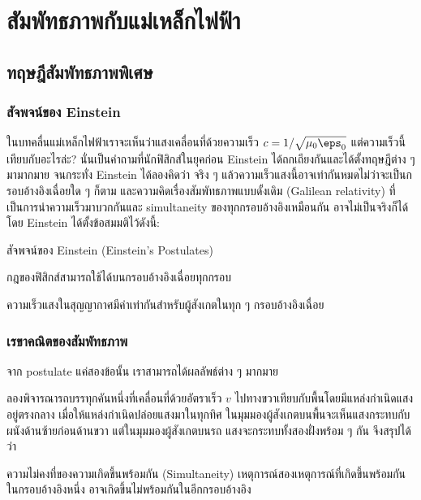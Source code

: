 \chapter{สัมพัทธภาพกับแม่เหล็กไฟฟ้า}

\section{ทฤษฎีสัมพัทธภาพพิเศษ}

\subsection{สัจพจน์ของ Einstein}

ในบทคลื่นแม่เหล็กไฟฟ้าเราจะเห็นว่าแสงเคลื่อนที่ด้วยความเร็ว $c = 1/\sqrt{\mu_0\eps_0}$ แต่ความเร็วนี้เทียบกับอะไรล่ะ? นั่นเป็นคำถามที่นักฟิสิกส์ในยุคก่อน Einstein ได้ถกเถียงกันและได้ตั้งทฤษฎีต่าง ๆ มามากมาย จนกระทั่ง Einstein ได้ลองคิดว่า จริง ๆ แล้วความเร็วแสงนี้อาจเท่ากันหมดไม่ว่าจะเป็นกรอบอ้างอิงเฉื่อยใด ๆ ก็ตาม และความคิดเรื่องสัมพัทธภาพแบบดั้งเดิม (Galilean relativity) ที่เป็นการนำความเร็วมาบวกกันและ simultaneity ของทุกกรอบอ้างอิงเหมือนกัน อาจไม่เป็นจริงก็ได้ โดย Einstein ได้ตั้งข้อสมมติไว้ดังนี้:
\begin{lawbox}{สัจพจน์ของ Einstein (Einstein's Postulates)}
    \begin{compactenum}
        \item กฎของฟิสิกส์สามารถใช้ได้บนกรอบอ้างอิงเฉื่อยทุกกรอบ
        \item ความเร็วแสงในสุญญากาศมีค่าเท่ากันสำหรับผู้สังเกตในทุก ๆ กรอบอ้างอิงเฉื่อย
    \end{compactenum}
\end{lawbox}

\subsection{เรขาคณิตของสัมพัทธภาพ}

จาก postulate แค่สองข้อนั้น เราสามารถได้ผลลัพธ์ต่าง ๆ มากมาย

ลองพิจารณารถบรรทุกคันหนึ่งที่เคลื่อนที่ด้วยอัตราเร็ว $v$ ไปทางขวาเทียบกับพื้นโดยมีแหล่งกำเนิดแสงอยู่ตรงกลาง เมื่อให้แหล่งกำเนิดปล่อยแสงมาในทุกทิศ ในมุมมองผู้สังเกตบนพื้นจะเห็นแสงกระทบกับผนังด้านซ้ายก่อนด้านขวา แต่ในมุมมองผู้สังเกตบนรถ แสงจะกระทบทั้งสองฝั่งพร้อม ๆ กัน จึงสรุปได้ว่า
\begin{lawbox}{ความไม่คงที่ของความเกิดขึ้นพร้อมกัน (Simultaneity)}
    เหตุการณ์สองเหตุการณ์ที่เกิดขึ้นพร้อมกันในกรอบอ้างอิงหนึ่ง อาจเกิดขึ้นไม่พร้อมกันในอีกกรอบอ้างอิง
\end{lawbox}

